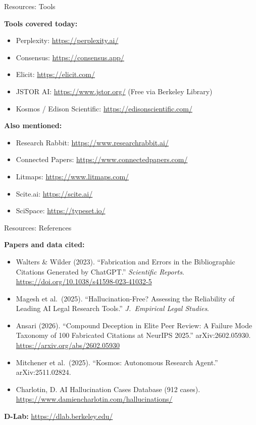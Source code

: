 \documentclass[aspectratio=169]{beamer}
\begin{document}
\begin{frame}{Resources: Tools}
    {\small
    \textbf{Tools covered today:}
    \begin{itemize}
        \item Perplexity: \url{https://perplexity.ai/}
        \item Consensus: \url{https://consensus.app/}
        \item Elicit: \url{https://elicit.com/}
        \item JSTOR AI: \url{https://www.jstor.org/} (Free via Berkeley Library)
        \item Kosmos / Edison Scientific: \url{https://edisonscientific.com/}
    \end{itemize}

    \vspace{0.5em}
    \textbf{Also mentioned:}
    \begin{itemize}
        \item Research Rabbit: \url{https://www.researchrabbit.ai/}
        \item Connected Papers: \url{https://www.connectedpapers.com/}
        \item Litmaps: \url{https://www.litmaps.com/}
        \item Scite.ai: \url{https://scite.ai/}
        \item SciSpace: \url{https://typeset.io/}
    \end{itemize}
    }
\end{frame}

\begin{frame}{Resources: References}
    {\small
    \textbf{Papers and data cited:}
    \begin{itemize}
        \item Walters \& Wilder (2023). ``Fabrication and Errors in the Bibliographic Citations Generated by ChatGPT.'' \textit{Scientific Reports}. \url{https://doi.org/10.1038/s41598-023-41032-5}
        \item Magesh et al.\ (2025). ``Hallucination-Free? Assessing the Reliability of Leading AI Legal Research Tools.'' \textit{J.\ Empirical Legal Studies}.
        \item Ansari (2026). ``Compound Deception in Elite Peer Review: A Failure Mode Taxonomy of 100 Fabricated Citations at NeurIPS 2025.'' arXiv:2602.05930. \url{https://arxiv.org/abs/2602.05930}
        \item Mitchener et al.\ (2025). ``Kosmos: Autonomous Research Agent.'' arXiv:2511.02824.
        \item Charlotin, D. AI Hallucination Cases Database (912 cases). \url{https://www.damiencharlotin.com/hallucinations/}
    \end{itemize}

    \vspace{0.5em}
    \textbf{D-Lab:} \url{https://dlab.berkeley.edu/}
    }
\end{frame}
\end{document}
